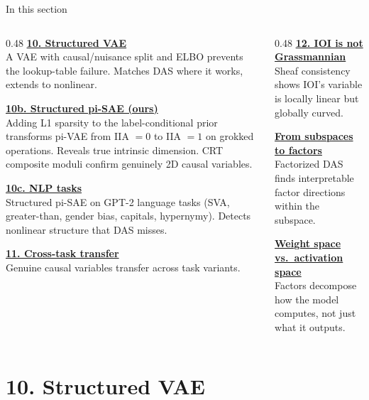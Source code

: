 \documentclass[aspectratio=169,11pt]{beamer}
\begin{document}
\begin{frame}{In this section}
\begin{columns}[T]
\begin{column}{0.48\textwidth}
\textbf{\hyperlink{sec10}{10. Structured VAE}}\\[0.2em]
{\small A VAE with causal/nuisance split and ELBO prevents the lookup-table failure. Matches DAS where it works, extends to nonlinear.}

\vspace{0.4em}
\textbf{\hyperlink{sec10b}{10b. Structured pi-SAE (ours)}}\\[0.2em]
{\small Adding L1 sparsity to the label-conditional prior transforms pi-VAE from IIA $= 0$ to IIA $= 1$ on grokked operations. Reveals true intrinsic dimension. CRT composite moduli confirm genuinely 2D causal variables.}

\vspace{0.4em}
\textbf{\hyperlink{sec10c}{10c. NLP tasks}}\\[0.2em]
{\small Structured pi-SAE on GPT-2 language tasks (SVA, greater-than, gender bias, capitals, hypernymy). Detects nonlinear structure that DAS misses.}

\vspace{0.4em}
\textbf{\hyperlink{sec11}{11. Cross-task transfer}}\\[0.2em]
{\small Genuine causal variables transfer across task variants.}
\end{column}
\begin{column}{0.48\textwidth}
\textbf{\hyperlink{sec12}{12. IOI is not Grassmannian}}\\[0.2em]
{\small Sheaf consistency shows IOI's variable is locally linear but globally curved.}

\vspace{0.4em}
\textbf{\hyperlink{sec12b}{From subspaces to factors}}\\[0.2em]
{\small Factorized DAS finds interpretable factor directions within the subspace.}

\vspace{0.4em}
\textbf{\hyperlink{sec12c}{Weight space vs.\ activation space}}\\[0.2em]
{\small Factors decompose how the model computes, not just what it outputs.}
\end{column}
\end{columns}
\end{frame}

\hypertarget{sec10}{}
\section{10. Structured VAE}
\end{document}
